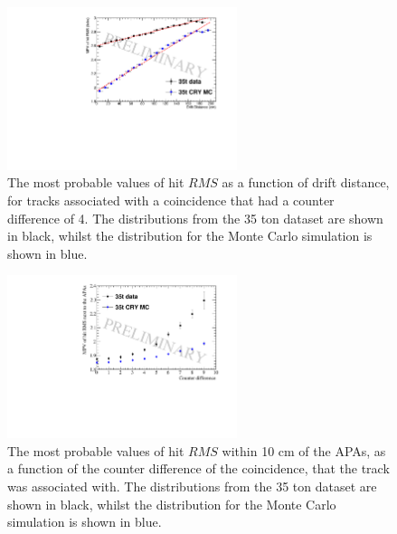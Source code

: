 \begin{figure}[h!]
  \centering
  \includegraphics[width=0.6\textwidth]{CounterDiff4_Overlay}
  \caption[The drift distance dependence of diffusion in the 35 ton dataset and Monte Carlo for coincidences with a counter difference of 4]
          {The most probable values of hit $RMS$ as a function of drift distance, for tracks associated with a coincidence that had a counter difference of 4. The distributions from the 35 ton dataset are shown in black, whilst the distribution for the Monte Carlo simulation is shown in blue.}
  \label{fig:DiffMCDataCompFit}
\end{figure}

\begin{figure}[h!]
  \centering
  \includegraphics[width=0.6\textwidth]{InterceptCanvasOverlay}
  \caption[The angular dependence of diffusion in the 35 ton dataset and Monte Carlo for hits within 10 cm of the APAs]
          {The most probable values of hit $RMS$ within 10 cm of the APAs, as a function of the counter difference of the coincidence, that the track was associated with. The distributions from the 35 ton dataset are shown in black, whilst the distribution for the Monte Carlo simulation is shown in blue.}
  \label{fig:DiffMCDataCompInt}
\end{figure}


